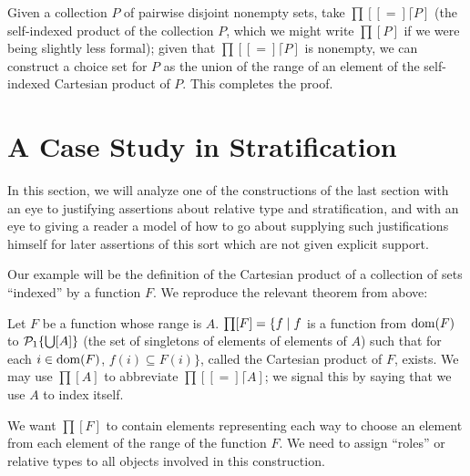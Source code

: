 Given a collection $P$ of pairwise disjoint nonempty sets, take
$\prod[[=]\lceil P]$ (the self-indexed product of the collection $P$,
which we might write $\prod[P]$ if we were being slightly less
formal); given that $\prod[[=] \lceil P]$ is nonempty, we can
construct a choice set for $P$ as the union of the range of an element
of the self-indexed Cartesian product of $P$.  This completes the
proof.
\finpreuve



\section{A Case Study in Stratification}

In this section, we will analyze one of the constructions of the last
section with an eye to justifying assertions about relative type and stratification, and with
an eye to giving a reader a model of how to go about supplying such
justifications himself for later
assertions of this sort which are not given explicit support.

Our example will be the definition of the Cartesian
product of a collection of sets ``indexed''
by a function $F$.  We reproduce the relevant theorem from above:

\begin{thm}
 Let $F$ be a function whose range is $A$.  $\prod[F] = \{f \mid
 f$ is a function from $\mathop{\mathrm{dom}}(F)$ to ${\cal P}_1\{\bigcup[A]\}$ (the set of 
 singletons of elements of elements of $A$) such that for each
 $i \in \mathop{\mathrm{dom}}(F)$, $f(i) \subseteq F(i)\}$, called the {\upshape
 Cartesian product} of $F$, exists.
 We may use $\prod[A]$ to abbreviate $\prod[[=] \lceil A]$; we signal this by
 saying that we use $A$ to index itself.
\end{thm}

We want $\prod[F]$ to contain elements representing each way to
choose an element from each element of the range of the function
$F$.  We need to assign ``roles'' or relative types to all objects
involved in this construction.

